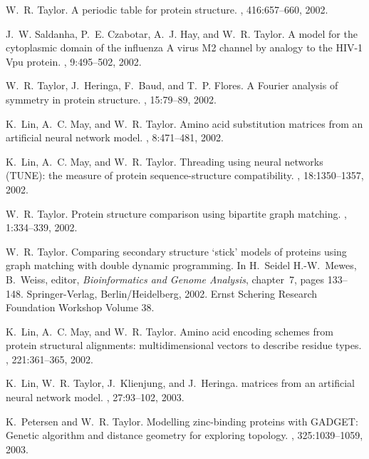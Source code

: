 \begin{thebibliography}{100}
W.~R. Taylor.
\newblock A periodic table for protein structure.
, 416:657--660, 2002.

J.~W. Saldanha, P.~E. Czabotar, A.~J. Hay, and W.~R. Taylor.
\newblock A model for the cytoplasmic domain of the influenza {A} virus {M2}
  channel by analogy to the {HIV-1 Vpu} protein.
, 9:495--502, 2002.

W.~R. Taylor, J.~Heringa, F.~Baud, and T.~P. Flores.
\newblock A {Fourier} analysis of symmetry in protein structure.
, 15:79--89, 2002.

K.~Lin, A.~C. May, and W.~R. Taylor.
\newblock Amino acid substitution matrices from an artificial neural network
  model.
, 8:471--481, 2002.

K.~Lin, A.~C. May, and W.~R. Taylor.
\newblock Threading using neural networks ({TUNE}): the measure of protein
  sequence-structure compatibility.
, 18:1350--1357, 2002.

W.~R. Taylor.
\newblock Protein structure comparison using bipartite graph matching.
, 1:334--339, 2002.

W.~R. Taylor.
\newblock Comparing secondary structure `stick' models of proteins using graph
  matching with double dynamic programming.
\newblock In H.~Seidel H.-W.~Mewes, B.~Weiss, editor, {\em Bioinformatics and
  Genome Analysis}, chapter~7, pages 133--148. Springer-Verlag,
  Berlin/Heidelberg, 2002.
\newblock Ernst Schering Research Foundation Workshop Volume 38.

K.~Lin, A.~C. May, and W.~R. Taylor.
\newblock Amino acid encoding schemes from protein structural alignments:
  multidimensional vectors to describe residue types.
, 221:361--365, 2002.

K.~Lin, W.~R. Taylor, J.~Klienjung, and J.~Heringa.
 matrices from an artificial neural network model.
, 27:93--102, 2003.

K.~Petersen and W.~R. Taylor.
\newblock Modelling zinc-binding proteins with {GADGET}: Genetic algorithm and
  distance geometry for exploring topology.
, 325:1039--1059, 2003.


\end{thebibliography}
